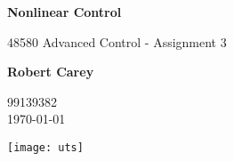 \begin{titlepage}
	\begin{center}
		\vspace*{1cm}
		
		\Huge
		\textbf{Nonlinear Control}
		
		\vspace{0.5cm}
		\LARGE
		48580 Advanced Control - Assignment 3
		
		\vspace{1.5cm}
		
		\textbf{Robert Carey}
		
		99139382\\
		\today
		
		\vfill
		
		
		\vspace{0.8cm}
		
		\texttt{[image: uts]}
		
		
		
	\end{center}
\end{titlepage}